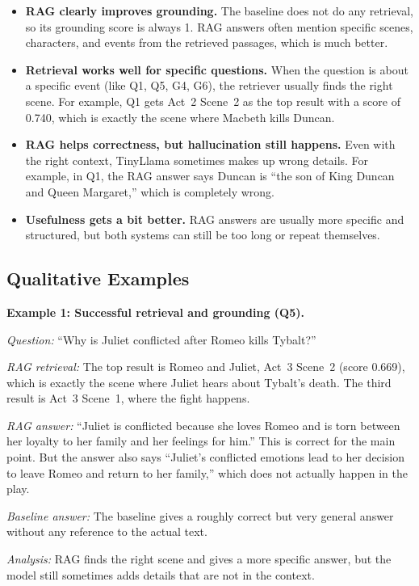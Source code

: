 \documentclass[10pt,conference]{IEEEtran}
\begin{document}
\begin{itemize}
    \item \textbf{RAG clearly improves grounding.} The baseline does not do any retrieval, so its grounding score is always 1. RAG answers often mention specific scenes, characters, and events from the retrieved passages, which is much better.
    \item \textbf{Retrieval works well for specific questions.} When the question is about a specific event (like Q1, Q5, G4, G6), the retriever usually finds the right scene. For example, Q1 gets Act~2 Scene~2 as the top result with a score of 0.740, which is exactly the scene where Macbeth kills Duncan.
    \item \textbf{RAG helps correctness, but hallucination still happens.} Even with the right context, TinyLlama sometimes makes up wrong details. For example, in Q1, the RAG answer says Duncan is ``the son of King Duncan and Queen Margaret,'' which is completely wrong.
    \item \textbf{Usefulness gets a bit better.} RAG answers are usually more specific and structured, but both systems can still be too long or repeat themselves.
\end{itemize}

\subsection{Qualitative Examples}

\textbf{Example 1: Successful retrieval and grounding (Q5).}

\textit{Question:} ``Why is Juliet conflicted after Romeo kills Tybalt?''

\textit{RAG retrieval:} The top result is Romeo and Juliet, Act~3 Scene~2 (score 0.669), which is exactly the scene where Juliet hears about Tybalt's death. The third result is Act~3 Scene~1, where the fight happens.

\textit{RAG answer:} ``Juliet is conflicted because she loves Romeo and is torn between her loyalty to her family and her feelings for him.'' This is correct for the main point. But the answer also says ``Juliet's conflicted emotions lead to her decision to leave Romeo and return to her family,'' which does not actually happen in the play.

\textit{Baseline answer:} The baseline gives a roughly correct but very general answer without any reference to the actual text.

\textit{Analysis:} RAG finds the right scene and gives a more specific answer, but the model still sometimes adds details that are not in the context.
\end{document}
